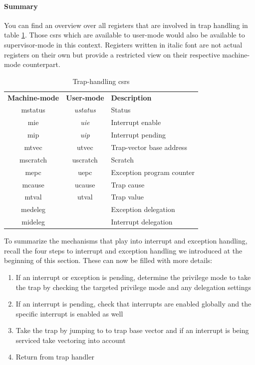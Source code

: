 \paragraph{Summary}
You can find an overview over all registers that are involved in trap handling in table \ref{tbl:trap-csrs}.
Those \glspl{csr} which are available to user-mode would also be available to supervisor-mode in this context.
Registers written in italic font are not actual registers on their own but provide a restricted view on their respective machine-mode counterpart.

\begin{table}
    \centering
    \begin{tabular}{| c c || l |}
        \hline
        \textbf{Machine-mode} & \textbf{User-mode} & \textbf{Description} \\
        \acrshort{mstatus} & \textit{\acrshort{ustatus}} & Status \\
        \acrshort{mie} & \textit{\acrshort{uie}} & Interrupt enable \\
        \acrshort{mip} & \textit{\acrshort{uip}} & Interrupt pending \\
        \acrshort{mtvec} & \acrshort{utvec} & Trap-vector base address \\
        \acrshort{mscratch} & \acrshort{uscratch} & Scratch \\
        \acrshort{mepc} & \acrshort{uepc} & Exception program counter \\
        \acrshort{mcause} & \acrshort{ucause} & Trap cause \\
        \acrshort{mtval} & \acrshort{utval} & Trap value \\
        \acrshort{medeleg} & & Exception delegation \\
        \acrshort{mideleg} & & Interrupt delegation \\
        \hline
    \end{tabular}
    \caption{Trap-handling \glspl{csr}}
    \label{tbl:trap-csrs}
\end{table}

To summarize the mechanisms that play into interrupt and exception handling, recall the four steps to interrupt and exception handling we introduced at the beginning of this section.
These can now be filled with more details:
\begin{enumerate}
    \item If an interrupt or exception is pending, determine the privilege mode to take the trap by checking the targeted privilege mode and any delegation settings
    \item If an interrupt is pending, check that interrupts are enabled globally and the specific interrupt is enabled as well
    \item Take the trap by jumping to to trap base vector and if an interrupt is being serviced take vectoring into account
    \item Return from trap handler
\end{enumerate}

